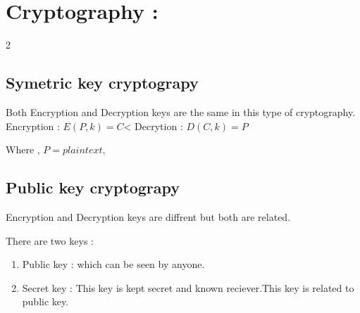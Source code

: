 \documentclass[11pt]{article}
\begin{document}
\newpage


\section{Cryptography :}
\begin {multicols}{2}
\subsection{Symetric key cryptograpy }
Both Encryption and Decryption keys are the same in this type of cryptography.
\newline
Encryption : $E(P,k)=C$<\newline
Decrytion : $D(C,k)=P$ \newline

Where , \newline
$P = plain text,$

\columnbreak
\subsection{Public key cryptograpy}
Encryption and Decryption keys are diffrent but both are related.\newline

There are two keys :
\begin{enumerate}
    \item Public key : which can be seen by anyone.
    \item Secret key : This key is kept secret and known reciever.This key is related to public key.
\end{enumerate}


\end{multicols}\\\\
\end{document}
